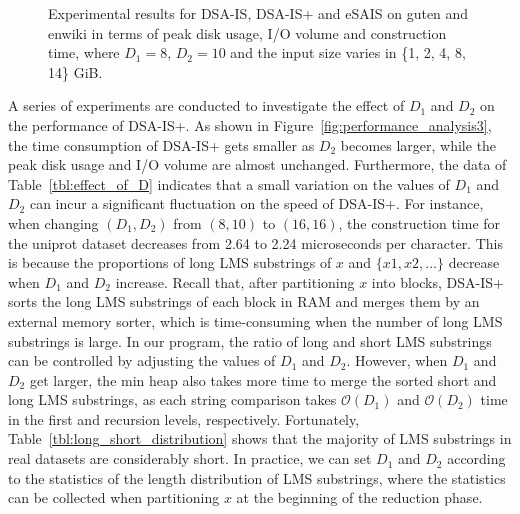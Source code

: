 \documentclass[10pt,journal,compsoc]{IEEEtran}
\begin{document}
\begin{figure}[htbp]
{\begin{minipage}[b]{0.45\textwidth}
	\end{minipage}
}
\caption{Experimental results for DSA-IS, DSA-IS+ and eSAIS on guten and enwiki in terms of peak disk usage, I/O volume and construction time, where $D_1 = 8$, $D_2 = 10$ and the input size varies in \{1, 2, 4, 8, 14\} GiB. }
\label{fig:performance_analysis2}
\end{figure}


A series of experiments are conducted to investigate the effect of $D_1$ and $D_2$ on the performance of DSA-IS+. As shown in Figure~\ref{fig:performance_analysis3}, the time consumption of DSA-IS+ gets smaller as $D_2$ becomes larger, while the peak disk usage and I/O volume are almost unchanged. Furthermore, the data of Table~\ref{tbl:effect_of_D} indicates that a small variation on the values of $D_1$ and $D_2$ can incur a significant fluctuation on the speed of DSA-IS+. For instance, when changing $(D_1, D_2)$ from $(8, 10)$ to $(16, 16)$, the construction time for the uniprot dataset decreases from 2.64 to 2.24 microseconds per character. This is because the proportions of long LMS substrings of $x$ and $\{x1, x2,...\}$ decrease when $D_1$ and $D_2$ increase. Recall that, after partitioning $x$ into blocks, DSA-IS+ sorts the long LMS substrings of each block in RAM and merges them by an external memory sorter, which is time-consuming when the number of long LMS substrings is large. In our program, the ratio of long and short LMS substrings can be controlled by adjusting the values of $D_1$ and $D_2$. However, when $D_1$ and $D_2$ get larger, the min heap also takes more time to merge the sorted short and long LMS substrings, as each string comparison takes $\mathcal{O}(D_1)$ and $\mathcal{O}(D_2)$ time in the first and recursion levels, respectively. Fortunately, Table~\ref{tbl:long_short_distribution} shows that the majority of LMS substrings in real datasets are considerably short. In practice, we can set $D_1$ and $D_2$ according to the statistics of the length distribution of LMS substrings, where the statistics can be collected when partitioning $x$ at the beginning of the reduction phase.
\end{document}

